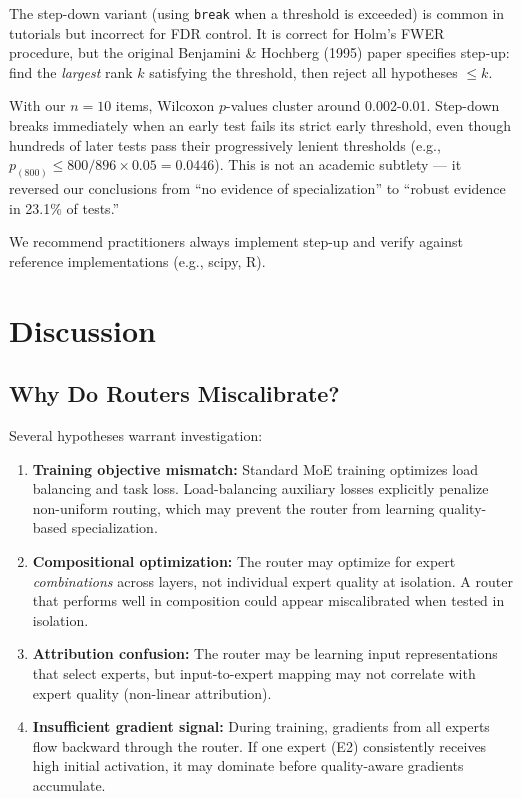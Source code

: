 \documentclass[11pt,a4paper]{article}
\begin{document}
The step-down variant (using \texttt{break} when a threshold is exceeded) is common in tutorials but incorrect for FDR control. It is correct for Holm's FWER procedure, but the original Benjamini \& Hochberg (1995) paper specifies step-up: find the \textit{largest} rank $k$ satisfying the threshold, then reject all hypotheses $\leq k$.

With our $n=10$ items, Wilcoxon $p$-values cluster around 0.002-0.01. Step-down breaks immediately when an early test fails its strict early threshold, even though hundreds of later tests pass their progressively lenient thresholds (e.g., $p_{(800)} \leq 800/896 \times 0.05 = 0.0446$). This is not an academic subtlety --- it reversed our conclusions from ``no evidence of specialization'' to ``robust evidence in 23.1\% of tests.''

We recommend practitioners always implement step-up and verify against reference implementations (e.g., scipy, R).

\section{Discussion}

\subsection{Why Do Routers Miscalibrate?}

Several hypotheses warrant investigation:

\begin{enumerate}
\item \textbf{Training objective mismatch:} Standard MoE training optimizes load balancing and task loss. Load-balancing auxiliary losses explicitly penalize non-uniform routing, which may prevent the router from learning quality-based specialization.

\item \textbf{Compositional optimization:} The router may optimize for expert \textit{combinations} across layers, not individual expert quality at isolation. A router that performs well in composition could appear miscalibrated when tested in isolation.

\item \textbf{Attribution confusion:} The router may be learning input representations that select experts, but input-to-expert mapping may not correlate with expert quality (non-linear attribution).

\item \textbf{Insufficient gradient signal:} During training, gradients from all experts flow backward through the router. If one expert (E2) consistently receives high initial activation, it may dominate before quality-aware gradients accumulate.
\end{enumerate}
\end{document}
